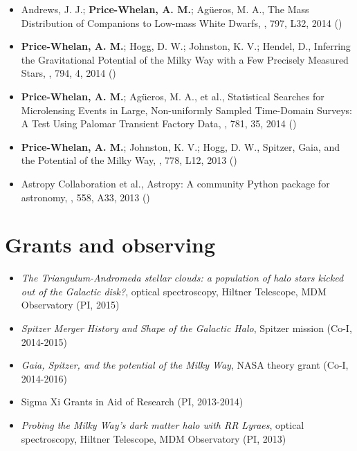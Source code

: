 \documentclass[12pt,letterpaper]{article}
\begin{document}
\begin{itemize}
\item Andrews, J. J.; {\bf Price-Whelan, A. M.}; Ag\"ueros, M. A., 
    {The Mass Distribution of Companions to Low-mass White Dwarfs},
    \apjl, 797, L32, 2014 ()

\item {\bf Price-Whelan, A. M.}; Hogg, D. W.; Johnston, K. V.; Hendel, D., 
    {Inferring the Gravitational Potential of the Milky Way with a Few Precisely Measured Stars},
    \apj, 794, 4, 2014 ()

\item {\bf Price-Whelan, A. M.}; Ag\"ueros, M. A., et al., 
    {Statistical Searches for Microlensing Events in Large, Non-uniformly Sampled Time-Domain Surveys: A Test Using Palomar Transient Factory Data},
    \apj, 781, 35, 2014 ()

\item {\bf Price-Whelan, A. M.}; Johnston, K. V.; Hogg, D. W., 
    {Spitzer, Gaia, and the Potential of the Milky Way},
    \apjl, 778, L12, 2013 ()

\item Astropy Collaboration et al., 
    {Astropy: A community Python package for astronomy},
    \aanda, 558, A33, 2013 ()

	\end{itemize}

\section*{Grants and observing }

	\begin{itemize}
	\item {\it The Triangulum-Andromeda stellar clouds: a population of halo stars kicked out of the Galactic disk?}, optical spectroscopy, Hiltner Telescope, MDM Observatory (PI, 2015)
	\item {\it Spitzer Merger History and Shape of the Galactic Halo}, Spitzer mission (Co-I, 2014-2015)
	\item {\it Gaia, Spitzer, and the potential of the Milky Way}, NASA theory grant (Co-I, 2014-2016)
	\item Sigma Xi Grants in Aid of Research (PI, 2013-2014)
	\item {\it Probing the Milky Way's dark matter halo with RR Lyraes}, optical spectroscopy, Hiltner Telescope, MDM Observatory (PI, 2013)
	\end{itemize}
\end{document}
